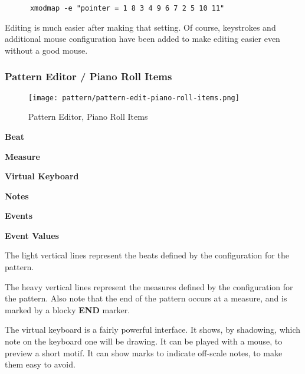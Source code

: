    \begin{verbatim}
      xmodmap -e "pointer = 1 8 3 4 9 6 7 2 5 10 11"
   \end{verbatim}

   Editing is much easier after making that setting.   Of course, keystrokes
   and additional mouse configuration have been added to make editing easier
   even without a good mouse.

\subsubsection{Pattern Editor / Piano Roll Items}
\label{subsubsec:seq64_pattern_editor_piano_roll_items}

\begin{figure}[H]
   \centering 
   \texttt{[image: pattern/pattern-edit-piano-roll-items.png]}
   \caption{Pattern Editor, Piano Roll Items}
   \label{fig:pattern_editor_piano_roll_items}
\end{figure}

   \begin{enumber}
      \item \textbf{Beat}
      \item \textbf{Measure}
      \item \textbf{Virtual Keyboard}
      \item \textbf{Notes}
      \item \textbf{Events}
      \item \textbf{Event Values}
   \end{enumber}

   \setcounter{ItemCounter}{0}      %

   The light vertical lines represent the beats defined by the configuration
   for the pattern.

   The heavy vertical lines represent the measures defined by the
   configuration for the pattern.
   Also note that the end of the pattern
   occurs at a measure, and is marked by a blocky \textbf{END} marker.

   The virtual keyboard is a fairly powerful interface.  It shows,
   by shadowing, which note on the keyboard one will be drawing. It can be
   played with a mouse, to preview a short motif.
   It can show marks to indicate off-scale notes, to make them easy to
   avoid.

